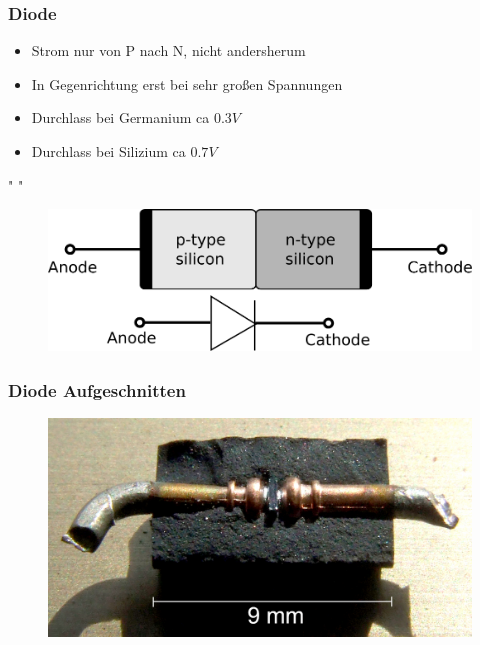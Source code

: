 \begin{frame}
    \frametitle{Diode}
    \begin{center}
    \begin{itemize}
			\item Strom nur von P nach N, nicht andersherum
			\item In Gegenrichtung erst bei sehr großen Spannungen
			\item Durchlass bei Germanium ca $0.3V$
			\item Durchlass bei Silizium ca $0.7V$
    \end{itemize} " "\\
	\begin{figure}
        \includegraphics[width=.7\textwidth,height=.8\textheight,keepaspectratio]{e12/diode_with_electrical_symbol.png}
        \end {figure}
	\end{center}
\end{frame}

\begin{frame}
    \frametitle{Diode Aufgeschnitten}
    \begin{center}
	\begin{figure}
        \includegraphics[width=1\textwidth,height=.8\textheight,keepaspectratio]{e12/Schottky_Diode_Section.jpg}
	\end{figure}
	\end{center}
\end{frame}

